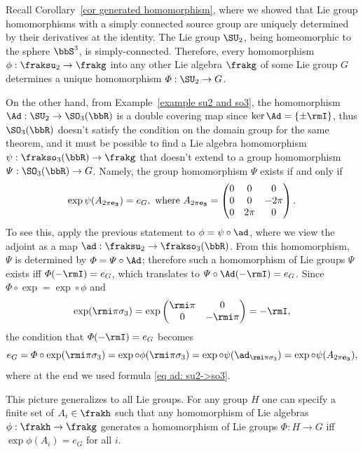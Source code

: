 \begin{example}
    Recall Corollary~\ref{cor generated homomorphism}, where we showed that Lie group homomorphisms with a simply connected source group are uniquely determined by their derivatives at the identity. The Lie group $\SU_2$, being homeomorphic to the sphere $\bbS^3$, is simply-connected. Therefore, every homomorphism $\phi:\fraksu_2\to\frakg$ into any other Lie algebra $\frakg$ of some Lie group $G$ determines a unique homomorphism $\varPhi:\SU_2\to G$. 
    
    On the other hand, from Example~\ref{example su2 and so3}, the homomorphism $\Ad:\SU_2\to \SO_3(\bbR)$ is a double covering map since $\ker\Ad=\{\pm \rmI\}$, thus $\SO_3(\bbR)$ doesn't satisfy the condition on the domain group for the same theorem, and it must be possible to find a Lie algebra homomorphism $\psi:\frakso_3(\bbR)\to\frakg$ that doesn't extend to a group homomorphism $\varPsi:\SO_3(\bbR)\to G$. Namely, the group homomorphism $\varPsi$ exists if and only if 
    \[\exp \psi(A_{2\pi \bf{e}_3})=e_G,\text{ where }A_{2\pi \bf{e}_3}=
    \begin{pmatrix}
        0&0&0\\
        0&0&-2\pi\\
        0&2\pi &0
    \end{pmatrix}.
    \]
    To see this, apply the previous statement to $\phi=\psi\circ\ad$, where we view the adjoint as a map $\ad:\fraksu_2\to\frakso_3(\bbR)$. From this homomorphism, $\varPsi$ is determined by $\varPhi=\varPsi\circ \Ad$; therefore such a homomorphism of Lie groups $\varPsi$ exists iff $\varPhi(-\rmI)=e_G$, which translates to $\varPsi\circ \Ad(-\rmI)=e_G$. Since $\varPhi\circ\exp=\exp\circ\phi$ and 
    \[\exp(\rmi \pi\sigma_3)=\exp \begin{pmatrix}
        \rmi \pi&0\\0 &-\rmi \pi
    \end{pmatrix}=-\rmI,\]
    the condition that $\varPhi(-\rmI)=e_G$ becomes
    \[e_G=\varPhi\circ \exp (\rmi\pi\sigma_3)=\exp\circ\phi (\rmi\pi\sigma_3)=\exp\circ\psi( \ad_{\rmi\pi\sigma_3})=\exp\circ\psi (A_{2\pi \bf{e}_3}),\]
    where at the end we used formula \eqref{eq ad: su2->so3}.
    
    This picture generalizes to all Lie groups. For any group $H$ one can specify a finite set of $A_i\in\frakh$ such that any homomorphism of Lie algebras $\phi:\frakh\to\frakg$ generates a homomorphism of Lie groups $\varPhi:H\to G$ iff $\exp\phi(A_i)=e_G$ for all $i$.
\end{example}


